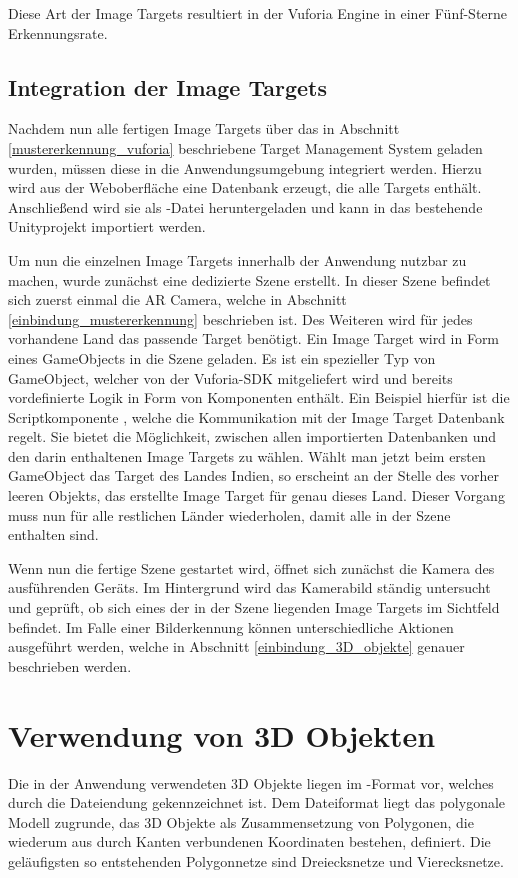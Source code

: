 Diese Art der Image Targets resultiert in der Vuforia Engine in einer Fünf-Sterne Erkennungsrate.

\subsection{Integration der Image Targets}\label{integration_image_targets}
Nachdem nun alle fertigen Image Targets über das in Abschnitt \ref{mustererkennung_vuforia} beschriebene Target Management System geladen wurden, müssen diese in die Anwendungsumgebung integriert werden.
Hierzu wird aus der Weboberfläche eine Datenbank erzeugt, die alle Targets enthält. 
Anschließend wird sie als -Datei heruntergeladen und kann in das bestehende Unityprojekt importiert werden.

Um nun die einzelnen Image Targets innerhalb der Anwendung nutzbar zu machen, wurde zunächst eine dedizierte Szene erstellt. 
In dieser Szene befindet sich zuerst einmal die AR Camera, welche in Abschnitt \ref{einbindung_mustererkennung} beschrieben ist. 
Des Weiteren wird für jedes vorhandene Land das passende Target benötigt.
Ein Image Target wird in Form eines GameObjects in die Szene geladen.
Es ist ein spezieller Typ von GameObject, welcher von der Vuforia-SDK mitgeliefert wird und bereits vordefinierte Logik in Form von Komponenten enthält.
Ein Beispiel hierfür ist die Scriptkomponente , welche die Kommunikation mit der Image Target Datenbank regelt. 
Sie bietet die Möglichkeit, zwischen allen importierten Datenbanken und den darin enthaltenen Image Targets zu wählen.
Wählt man jetzt beim ersten GameObject das Target des Landes Indien, so erscheint an der Stelle des vorher leeren Objekts, das erstellte Image Target für genau dieses Land.
Dieser Vorgang muss nun für alle restlichen Länder wiederholen, damit alle in der Szene enthalten sind.

Wenn nun die fertige Szene gestartet wird, öffnet sich zunächst die Kamera des ausführenden Geräts.
Im Hintergrund wird das Kamerabild ständig untersucht und geprüft, ob sich eines der in der Szene liegenden Image Targets im Sichtfeld befindet. Im Falle einer Bilderkennung können unterschiedliche Aktionen ausgeführt werden, welche in Abschnitt \ref{einbindung_3D_objekte} genauer beschrieben werden.

\section{Verwendung von 3D Objekten}\label{verwendung_3d_objekte}
Die in der Anwendung verwendeten 3D Objekte liegen im -Format vor, welches durch die Dateiendung  gekennzeichnet ist. 
Dem Dateiformat liegt das polygonale Modell zugrunde, das 3D Objekte als Zusammensetzung von Polygonen, die wiederum aus durch Kanten verbundenen Koordinaten bestehen, definiert. 
Die geläufigsten so entstehenden Polygonnetze sind Dreiecksnetze und Vierecksnetze.


